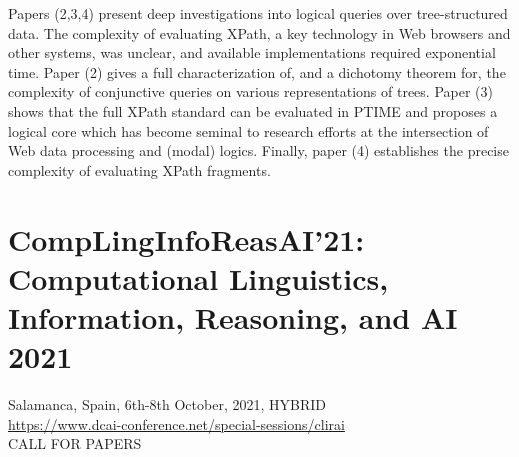 \documentclass[prodmode,acmtecs]{acmsmall} %
\begin{document}
\begin{itemize}
  Papers (2,3,4) present deep investigations into logical queries over tree-structured data. The complexity of evaluating XPath, a key technology in Web browsers and other systems, was unclear, and available implementations required exponential time. Paper (2) gives a full characterization of, and a dichotomy theorem for, the complexity of conjunctive queries on various representations of trees. Paper (3) shows that the full XPath standard can be evaluated in PTIME and proposes a logical core which has become seminal to research eﬀorts at the intersection of Web data processing and (modal) logics. Finally, paper (4) establishes the precise complexity of evaluating XPath fragments. 
 
\end{itemize}\section{CompLingInfoReasAI'21: Computational Linguistics, Information, Reasoning, and AI 2021}\label{CompLingInfoReasAI21}  Salamanca, Spain, 6th-8th October, 2021, HYBRID  \\ 
  \href{https://www.dcai-conference.net/special-sessions/clirai}{https://www.dcai-conference.net/special-sessions/clirai}\\ 
CALL FOR PAPERS 
\end{document}
